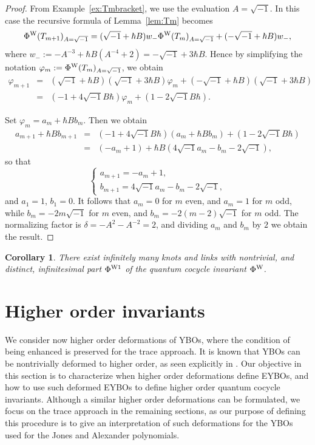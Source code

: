 \documentclass[11pt,fleqn]{amsart} %
\newtheorem{corollary}[theorem]{Corollary}
\begin{document}
	\begin{proof} 
		From Example~\ref{ex:Tmbracket}, we use the evaluation $A=\sqrt{-1}$.
		In this case the recursive formula of Lemma~\ref{lem:Tm} becomes
		$$ \Phi^{\rm W} (T_{m+1})_{A=\sqrt{-1}}  = ( \sqrt{-1}+ \hbar B )   w_-  \Phi^{\rm W}(T_m)_{A=\sqrt{-1}} +  ( - \sqrt{-1} +   \hbar B) w_- ,$$
		where 
		$w_- := - A^{-3} + \hbar B (A^{-4} + 2 )  = - \sqrt{-1} + 3 \hbar  B  $.
		Hence by simplifying the notation  $\varphi_m:=  \Phi^{\rm W}(T_m)_{A=\sqrt{-1}} $, we obtain 
		\begin{eqnarray*}
			\varphi_{m+1} 
			&=&
			(\sqrt{-1} + \hbar B)(\sqrt{-1}+3\hbar B)\varphi_m + (-\sqrt{-1} + \hbar B)(\sqrt{-1}+3\hbar B)\\
			&=&
			(-1+4\sqrt{-1}B\hbar)\varphi_m + (1-2\sqrt{-1}B\hbar ). 
		\end{eqnarray*}
		
		Set $\varphi_m=a_m + \hbar B b_m$. Then we obtain 
		\begin{eqnarray*}
			a_{m+1} + \hbar B b_{m+1} &=&  (-1+4\sqrt{-1}B\hbar) (a_m + \hbar B b_m) + (1-2\sqrt{-1}B\hbar )\\
			&=& (-a_m +1) + \hbar B (4 \sqrt{-1} a_m - b_m - 2 \sqrt{-1} ),
		\end{eqnarray*}
		so that 
		$$  \begin{cases} a_{m+1} = -a_m +1 , \\
		b_{m+1} = 4 \sqrt{-1} a_m - b_m - 2 \sqrt{-1} , 
		\end{cases}
		$$
		and $a_1=1$, $b_1=0$. 
		It follows that $a_m=0$ for $m$ even, and $a_m = 1$ for $m$ odd, while 
		$b_m = -2m\sqrt{-1}$ for $m$ even, and $b_m = -2(m-2)\sqrt{-1}$ for $m$ odd. The normalizing factor is $\delta = -A^2-A^{-2} = 2$, 
		and dividing $a_m$ and $b_m$ by $2$ we obtain the result. 
	\end{proof}

	
	\begin{corollary}
		There exist infinitely many knots and links with nontrivial, and distinct, infinitesimal part $\Phi^{{\rm W} 1}$ of the quantum cocycle invariant $\Phi^{{\rm W}}$.
	\end{corollary}
	




\section{Higher order invariants}\label{sec:higher_def}


We consider now higher order deformations
 of YBOs, where the condition of being enhanced is preserved
 for the trace approach.  It is known that YBOs can be nontrivially deformed to higher order, as seen explicitly in \cite{EZ_perturbative}. Our objective in this section is to characterize when higher order deformations define EYBOs, and how to use such 
 deformed  
 EYBOs to define higher order quantum cocycle invariants.
  Although a  similar higher order deformations can be formulated, 
we focus on the trace approach in the remaining sections, as our purpose  of defining this procedure is to give an interpretation of such deformations for the YBOs used for the Jones and Alexander polynomials. 
\end{document}
